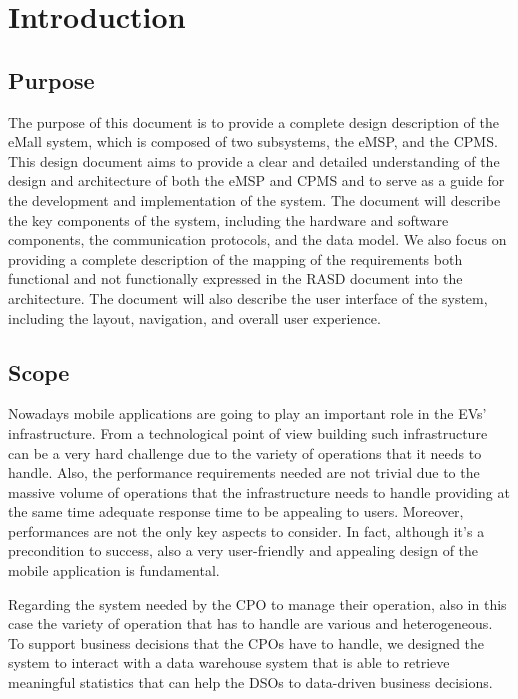 \documentclass{Configuration_Files/PoliMi3i_thesis}
\begin{document}
\mainmatter %

\chapter{Introduction}

\section{Purpose}

The purpose of this document is to provide a complete design description of the eMall system, which is composed of two subsystems, the eMSP, and the CPMS. This design document aims to provide a clear and detailed understanding of the design and architecture of both the eMSP and CPMS and to serve as a guide for the development and implementation of the system. 
The document will describe the key components of the system, including the hardware and software components, the communication protocols, and the data model. We also focus on providing a complete description of the mapping of the requirements both functional and not functionally expressed in the RASD document into the architecture. The document  will also describe the user interface of the system, including the layout, navigation, and overall user experience.

\section{Scope}

Nowadays mobile applications are going to play an important role in the EVs' infrastructure. From a technological point of view building such infrastructure can be a very hard challenge due to the variety of operations that it needs to handle. Also, the performance requirements needed are not trivial due to the massive volume of operations that the infrastructure needs to handle providing at the same time adequate response time to be appealing to users. 
Moreover, performances are not the only key aspects to consider. In fact, although it's a precondition to success, also a very user-friendly and appealing design of the mobile application is fundamental. 

Regarding the system needed by the CPO to manage their operation, also in this case the variety of operation that has to handle are various and heterogeneous. To support business decisions that the CPOs have to handle, we designed the system to interact with a data warehouse system that is able to retrieve meaningful statistics that can help the DSOs to data-driven business decisions. 
\end{document}
